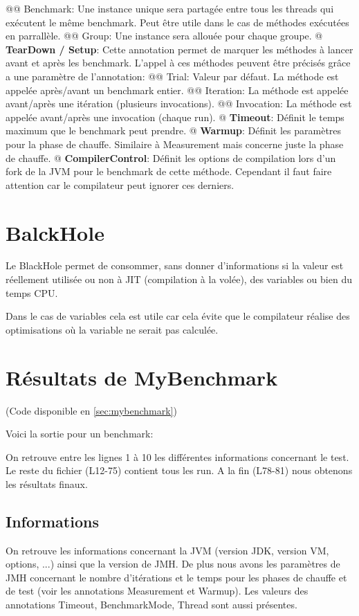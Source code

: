 \documentclass{report}
\begin{document}
\begin{easylist}[itemize]
				@@ Benchmark: Une instance unique sera partagée entre tous les threads qui exécutent le même benchmark. 
				Peut être utile dans le cas de méthodes exécutées en parrallèle.
				@@ Group: Une instance sera allouée pour chaque groupe.
				@ \textbf{TearDown / Setup}: Cette annotation permet de marquer les méthodes à lancer avant et après les benchmark.
				L'appel à ces méthodes peuvent être précisés grâce a une paramètre de l'annotation:
				@@ Trial: Valeur par défaut. La méthode est appelée après/avant un benchmark entier.
				@@ Iteration: La méthode est appelée avant/après une itération (plusieurs invocations).
				@@ Invocation: La méthode est appelée avant/après une invocation (chaque run).
				@ \textbf{Timeout}: Définit le temps maximum que le benchmark peut prendre.
				@ \textbf{Warmup}: Définit les paramètres pour la phase de chauffe.
				Similaire à Measurement mais concerne juste la phase de chauffe.
				@ \textbf{CompilerControl}: Définit les options de compilation lors d'un fork de la JVM pour le benchmark de cette méthode.
				Cependant il faut faire attention car le compilateur peut ignorer ces derniers.
			\end{easylist}
		
		\section{BalckHole}
			Le BlackHole permet de consommer, sans donner d'informations si la valeur est réellement utilisée ou non à JIT (compilation à la volée), des variables ou bien du temps CPU.
			
			Dans le cas de variables cela est utile car cela évite que le compilateur réalise des optimisations où la variable ne serait pas calculée.
			
		\section{Résultats de MyBenchmark}
			(Code disponible en \autoref{sec:mybenchmark})
		
			Voici la sortie pour un benchmark:
			
			
			On retrouve entre les lignes 1 à 10 les différentes informations concernant le test.
			Le reste du fichier (L12-75) contient tous les run.
			A la fin (L78-81) nous obtenons les résultats finaux.
			
			\subsection{Informations}
				On retrouve les informations concernant la JVM (version JDK, version VM, options, ...) ainsi que la version de JMH.
				De plus nous avons les paramètres de JMH concernant le nombre d'itérations et le temps pour les phases de chauffe et de test (voir les annotations Measurement et Warmup).
				Les valeurs des annotations Timeout, BenchmarkMode, Thread sont aussi présentes.
			
\end{document}
